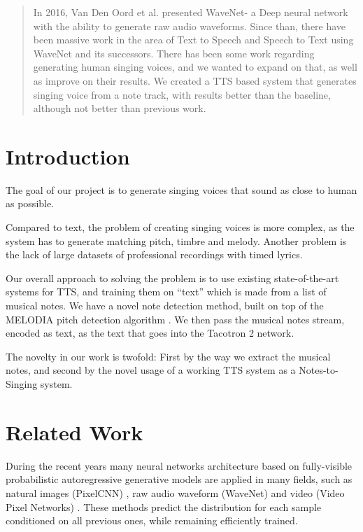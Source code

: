 \documentclass{article}
\begin{document}
\begin{abstract}
In 2016, Van Den Oord et al. presented WaveNet- a Deep neural network with the ability to generate raw audio waveforms.
Since than, there have been massive work in the area of Text to Speech and Speech to Text using WaveNet and its successors.
There has been some work regarding generating human singing voices, and we wanted to expand on that, as well as improve on their results.
We created a TTS based system that generates singing voice from a note track, with results better than the baseline, although not better than previous work.
\end{abstract}

\section{Introduction}
\label{introduction}
The goal of our project is to generate singing voices that sound as close to human as possible. 

Compared to text, the problem of creating singing voices is more complex, as the system has to generate matching pitch, timbre and melody.
Another problem is the lack of large datasets of professional recordings with timed lyrics.

Our overall approach to solving the problem is to use existing state-of-the-art systems for TTS, and training them on ``text'' which is made from a list of musical notes. We have a novel note detection method, built on top of the MELODIA pitch detection algorithm \cite{melodia}.
We then pass the musical notes stream, encoded as text, as the text that goes into the Tacotron 2 network.

The novelty in our work is twofold:
First by the way we extract the musical notes, and second by the novel usage of a working TTS system as a Notes-to-Singing system. 

\section{Related Work}
During the recent years many neural networks architecture based on fully-visible probabilistic autoregressive generative models are applied in many fields, such as natural images (PixelCNN) \cite{van2016conditional}, raw audio waveform (WaveNet) \cite{van2016wavenet} and video (Video Pixel Networks) \cite{kalchbrenner2016video}. These methods predict the distribution for each sample conditioned on all previous ones, while remaining efficiently trained.
\end{document}
